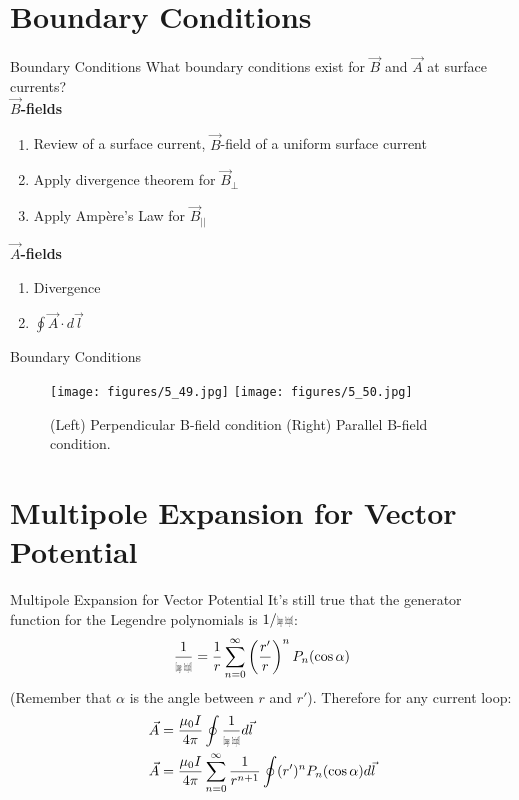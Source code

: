 \documentclass{beamer}
\def\rcurs{{\mbox{$\resizebox{.16in}{.08in}{\texttt{[image: ScriptR]}}$}}}
\begin{document}
\section{Boundary Conditions}

\begin{frame}{Boundary Conditions}
What boundary conditions exist for $\vec{B}$ and $\vec{A}$ at surface currents? \\ \vspace{0.25cm}
\textbf{$\vec{B}$-fields}
\begin{enumerate}
\item Review of a surface current, $\vec{B}$-field of a uniform surface current
\item Apply divergence theorem for $\vec{B}_{\perp}$
\item Apply Amp\`{e}re's Law for $\vec{B}_{||}$
\end{enumerate}
\textbf{$\vec{A}$-fields}
\begin{enumerate}
\item Divergence
\item $\oint \vec{A} \cdot d\vec{l}$
\end{enumerate}
\end{frame}

\begin{frame}{Boundary Conditions}
\begin{figure}
\centering
\texttt{[image: figures/5\_49.jpg]}
\texttt{[image: figures/5\_50.jpg]}
\caption{\label{fig:bound} (Left) Perpendicular B-field condition (Right) Parallel B-field condition.}
\end{figure}
\end{frame}

\section{Multipole Expansion for Vector Potential}

\begin{frame}{Multipole Expansion for Vector Potential}
It's still true that the generator function for the Legendre polynomials is $1/\rcurs$:
\begin{equation}
\frac{1}{\rcurs} = \frac{1}{r}\sum_{n=0}^{\infty} \left(\frac{r'}{r}\right)^n P_n(\cos\alpha)
\end{equation}
(Remember that $\alpha$ is the angle between $r$ and $r'$).  Therefore for any current loop:
\begin{align}
\vec{A} &= \frac{\mu_0 I}{4\pi} \oint \frac{1}{\rcurs} d\vec{l} \\
\vec{A} &= \frac{\mu_0 I}{4\pi} \sum_{n=0}^{\infty} \frac{1}{r^{n+1}} \oint (r')^n P_n(\cos\alpha) d\vec{l} \label{eq:multA}
\end{align}
\end{frame}
\end{document}
